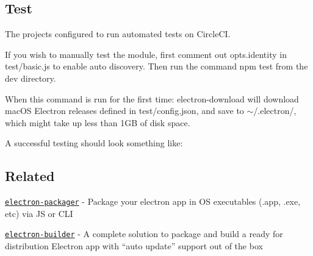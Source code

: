 \subsection*{Test}

The project\textquotesingle{}s configured to run automated tests on Circle\+CI.

If you wish to manually test the module, first comment out {\ttfamily opts.\+identity} in {\ttfamily test/basic.\+js} to enable auto discovery. Then run the command {\ttfamily npm test} from the dev directory.

When this command is run for the first time\+: {\ttfamily electron-\/download} will download mac\+OS Electron releases defined in {\ttfamily test/config.\+json}, and save to {\ttfamily $\sim$/.electron/}, which might take up less than 1\+GB of disk space.

A successful testing should look something like\+:




\subsection*{Related}


\begin{DoxyItemize}
\item \href{https://github.com/electron-userland/electron-packager}{\tt electron-\/packager} -\/ Package your electron app in OS executables (.app, .exe, etc) via JS or C\+LI
\item \href{https://github.com/electron-userland/electron-builder}{\tt electron-\/builder} -\/ A complete solution to package and build a ready for distribution Electron app with “auto update” support out of the box 
\end{DoxyItemize}